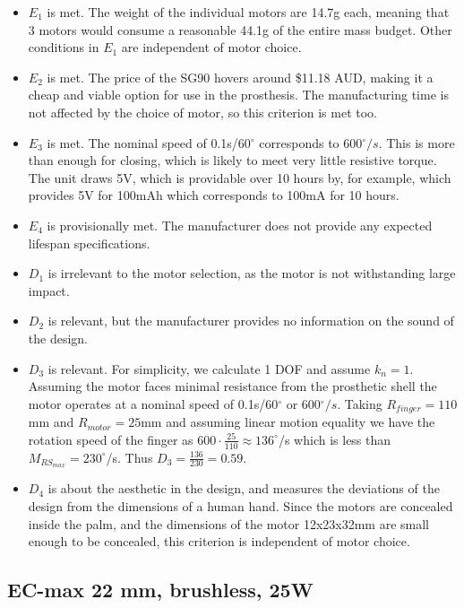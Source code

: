 \documentclass[11pt,3p]{report}
\begin{document}
\begin{multicols}{2}
		\begin{itemize}
		    \item[\checkmark] $E_1$ is met. The weight of the individual motors are 14.7g each, meaning that 3 motors would consume a reasonable 44.1g of the entire mass budget. Other conditions in $E_1$ are independent of motor choice.
		    \item[\checkmark] $E_2$ is met. The price of the SG90 hovers around \$11.18 AUD, making it a cheap and viable option for use in the prosthesis. The manufacturing time is not affected by the choice of motor, so this criterion is met too.
		    \item[\checkmark] $E_3$ is met. The nominal speed of 0.1s/60$^{\circ}$ corresponds to 600$^{\circ}/s$. This is more than enough for closing, which is likely to meet very little resistive torque. The unit draws 5V, which is providable over 10 hours by, for example, \cite{coreelectronics} which provides 5V for 100mAh which corresponds to 100mA for 10 hours. 
		    \item[\checkmark] $E_4$ is provisionally met. The manufacturer does not provide any expected lifespan specifications.
		    \item $D_1$ is irrelevant to the motor selection, as the motor is not withstanding large impact.
		    \item $D_2$ is relevant, but the manufacturer provides no information on the sound of the design.
			\item $D_3$ is relevant. For simplicity, we calculate 1 DOF and assume $k_n = 1$. Assuming the motor faces minimal resistance from the prosthetic shell the motor operates at a nominal speed of 0.1s/60$^{\circ}$ or 600$^{\circ}/s$. Taking $R_{finger} = 110$mm and $R_{motor} = 25$mm and assuming linear motion equality we have the rotation speed of the finger as $600\cdot\frac{25}{110} \approx 136^\circ$/s which is less than $M_{RS_{max}}= 230^\circ$/s. Thus $D_3 = \frac{136}{230} = 0.59$.
		    \item $D_4$ is about the aesthetic in the design, and measures the deviations of the design from the dimensions of a
		    human hand. Since the motors are concealed inside the palm, and the dimensions of the motor 12x23x32mm are small enough to be concealed, this criterion is independent of motor choice.

		\end{itemize}
	
		\subsection{EC-max 22 mm, brushless, 25W}
		

\end{multicols}
\end{document}
